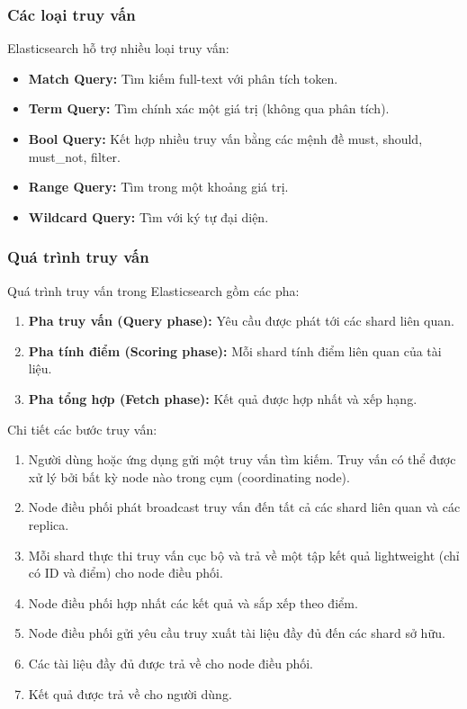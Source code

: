 \documentclass[../BTL.tex]{subfiles}
\begin{document}
\subsubsection{Các loại truy vấn}
Elasticsearch hỗ trợ nhiều loại truy vấn:
\begin{itemize}
    \item \textbf{Match Query:} Tìm kiếm full-text với phân tích token.
    
    \item \textbf{Term Query:} Tìm chính xác một giá trị (không qua phân tích).
    
    \item \textbf{Bool Query:} Kết hợp nhiều truy vấn bằng các mệnh đề must, should, must\_not, filter.
    
    \item \textbf{Range Query:} Tìm trong một khoảng giá trị.
    
    \item \textbf{Wildcard Query:} Tìm với ký tự đại diện.
\end{itemize}

\subsubsection{Quá trình truy vấn}
Quá trình truy vấn trong Elasticsearch gồm các pha:
\begin{enumerate}
    \item \textbf{Pha truy vấn (Query phase):} Yêu cầu được phát tới các shard liên quan.
    
    \item \textbf{Pha tính điểm (Scoring phase):} Mỗi shard tính điểm liên quan của tài liệu.
    
    \item \textbf{Pha tổng hợp (Fetch phase):} Kết quả được hợp nhất và xếp hạng.
\end{enumerate}

Chi tiết các bước truy vấn:
\begin{enumerate}
    \item Người dùng hoặc ứng dụng gửi một truy vấn tìm kiếm. Truy vấn có thể được xử lý bởi bất kỳ node nào trong cụm (coordinating node).
    
    \item Node điều phối phát broadcast truy vấn đến tất cả các shard liên quan và các replica.
    
    \item Mỗi shard thực thi truy vấn cục bộ và trả về một tập kết quả lightweight (chỉ có ID và điểm) cho node điều phối.
    
    \item Node điều phối hợp nhất các kết quả và sắp xếp theo điểm.
    
    \item Node điều phối gửi yêu cầu truy xuất tài liệu đầy đủ đến các shard sở hữu.
    
    \item Các tài liệu đầy đủ được trả về cho node điều phối.
    
    \item Kết quả được trả về cho người dùng.
\end{enumerate}
\end{document}

